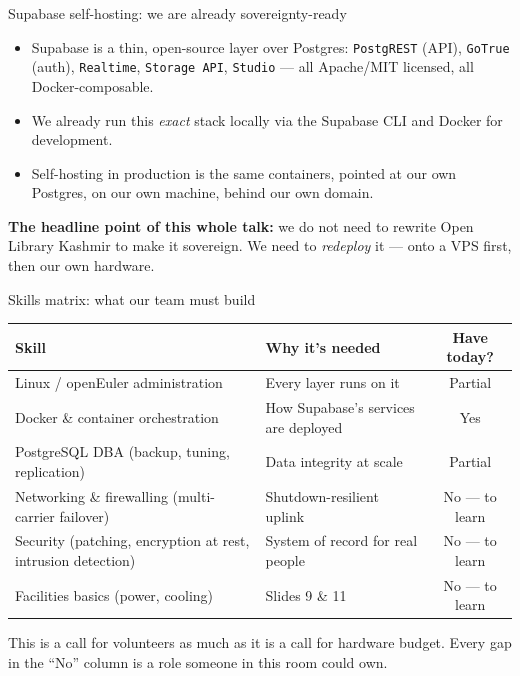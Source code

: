 \documentclass[aspectratio=169,10pt]{beamer}
\begin{document}
\begin{frame}{Supabase self-hosting: we are already sovereignty-ready}
  \begin{itemize}
    \item Supabase is a thin, open-source layer over Postgres: \texttt{PostgREST} (API), \texttt{GoTrue} (auth), \texttt{Realtime}, \texttt{Storage API}, \texttt{Studio} --- all Apache/MIT licensed, all Docker-composable.
    \item We already run this \emph{exact} stack locally via the Supabase CLI and Docker for development.
    \item Self-hosting in production is the same containers, pointed at our own Postgres, on our own machine, behind our own domain.
  \end{itemize}
  \vspace{10pt}
  \begin{takeaway}
   \textbf{The headline point of this whole talk:} we do not need to rewrite Open Library Kashmir to make it sovereign. We need to \emph{redeploy} it --- onto a VPS first, then our own hardware.
  \end{takeaway}
\end{frame}

\begin{frame}{Skills matrix: what our team must build}
  \small
  \renewcommand{\arraystretch}{1.25}
  \begin{tabularx}{\linewidth}{@{}>{\raggedright\arraybackslash}X>{\raggedright\arraybackslash}X c@{}}
    \toprule
    \textbf{Skill} & \textbf{Why it's needed} & \textbf{Have today?} \\
    \midrule
    Linux / openEuler administration & Every layer runs on it & Partial \\
    Docker \& container orchestration & How Supabase's services are deployed & Yes \\
    PostgreSQL DBA (backup, tuning, replication) & Data integrity at scale & Partial \\
    Networking \& firewalling (multi-carrier failover) & Shutdown-resilient uplink & No --- to learn \\
    Security (patching, encryption at rest, intrusion detection) & System of record for real people & No --- to learn \\
    Facilities basics (power, cooling) & Slides 9 \& 11 & No --- to learn \\
    \bottomrule
  \end{tabularx}
  \vspace{8pt}
  \begin{takeaway}
   This is a call for volunteers as much as it is a call for hardware budget. Every gap in the ``No'' column is a role someone in this room could own.
  \end{takeaway}
\end{frame}
\end{document}
